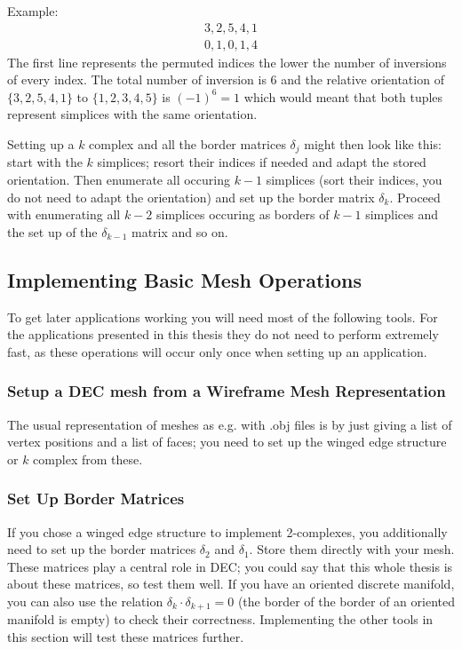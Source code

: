 Example: 
\begin{eqnarray*}
3,2,5,4,1 \\
0,1,0,1,4
\end{eqnarray*}
The first line represents the permuted indices the lower the number of inversions of every index. The total number of inversion is 6 and the relative orientation of
$\{3,2,5,4,1\}$ to $\{1,2,3,4,5\}$ is $(-1)^6 = 1$ which would meant that both tuples represent simplices with the same orientation.

Setting up a $k$ complex  and all the border matrices $\delta_j$ might then look like this: start with the $k$ simplices; resort their indices if needed and adapt the stored orientation.
Then enumerate all occuring $k-1$ simplices (sort their indices, you do not need to adapt the orientation) and set up the border matrix $\delta_k$. Proceed with enumerating all $k-2$ simplices occuring as borders of $k-1$ simplices and the set up of the $\delta_{k-1}$ matrix and so on.

		
\subsection{Implementing Basic Mesh Operations}
To get later applications working you will need most of the following tools. For the applications presented in this thesis they do not need to perform extremely fast, as these operations will occur only once when setting up an application.

\subsubsection{Setup a DEC mesh from a Wireframe Mesh Representation}
The usual representation of meshes as e.g. with .obj files is by just giving a list of vertex positions and a list of faces; you need to set up the winged edge structure or $k$ complex from these.
	
\subsubsection{Set Up Border Matrices}
If you chose a winged edge structure to implement 2-complexes, you additionally need to set up the border matrices $\delta_2$ and $\delta_1$. Store them directly with your mesh. These matrices play a central role in DEC; you could say that this whole thesis is about these matrices, so test them well. If you have an oriented discrete manifold, you can also use the relation $\delta_{k}\cdot \delta_{k+1} = 0$ (the border of the border of an oriented manifold is empty) to check their correctness. Implementing the other tools in this section will test these matrices further.

